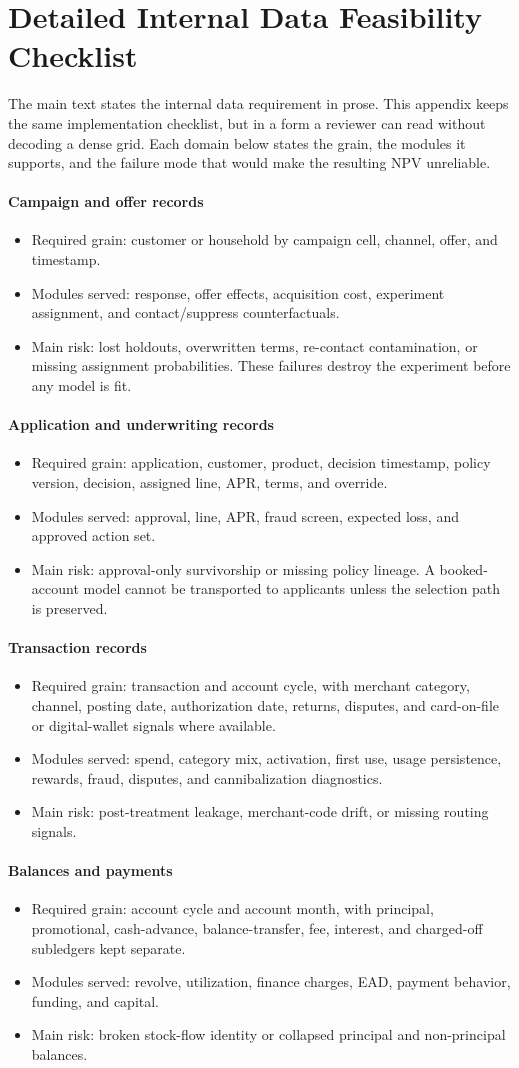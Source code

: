 \documentclass[11pt]{article}
\newcommand{\1}{\mathbf{1}}
\newcommand{\contractitem}[2]{\paragraph{#1}\begin{itemize}[leftmargin=1.5em,itemsep=0.12em,topsep=0.18em]#2\end{itemize}}
\begin{document}
\section{Detailed Internal Data Feasibility Checklist}
\label{sec:appendix-internal-data-feasibility}

The main text states the internal data requirement in prose. This appendix
keeps the same implementation checklist, but in a form a reviewer can read
without decoding a dense grid. Each domain below states the grain, the modules
it supports, and the failure mode that would make the resulting NPV unreliable.

\contractitem{Campaign and offer records}{
  \item Required grain: customer or household by campaign cell, channel, offer,
        and timestamp.
  \item Modules served: response, offer effects, acquisition cost, experiment
        assignment, and contact/suppress counterfactuals.
  \item Main risk: lost holdouts, overwritten terms, re-contact contamination,
        or missing assignment probabilities. These failures destroy the
        experiment before any model is fit.
}
\contractitem{Application and underwriting records}{
  \item Required grain: application, customer, product, decision timestamp,
        policy version, decision, assigned line, APR, terms, and override.
  \item Modules served: approval, line, APR, fraud screen, expected loss, and
        approved action set.
  \item Main risk: approval-only survivorship or missing policy lineage. A
        booked-account model cannot be transported to applicants unless the
        selection path is preserved.
}
\contractitem{Transaction records}{
  \item Required grain: transaction and account cycle, with merchant category,
        channel, posting date, authorization date, returns, disputes, and
        card-on-file or digital-wallet signals where available.
  \item Modules served: spend, category mix, activation, first use, usage
        persistence, rewards, fraud, disputes, and cannibalization diagnostics.
  \item Main risk: post-treatment leakage, merchant-code drift, or missing
        routing signals.
}
\contractitem{Balances and payments}{
  \item Required grain: account cycle and account month, with principal,
        promotional, cash-advance, balance-transfer, fee, interest, and
        charged-off subledgers kept separate.
  \item Modules served: revolve, utilization, finance charges, EAD, payment
        behavior, funding, and capital.
  \item Main risk: broken stock-flow identity or collapsed principal and
        non-principal balances.
}
\end{document}
